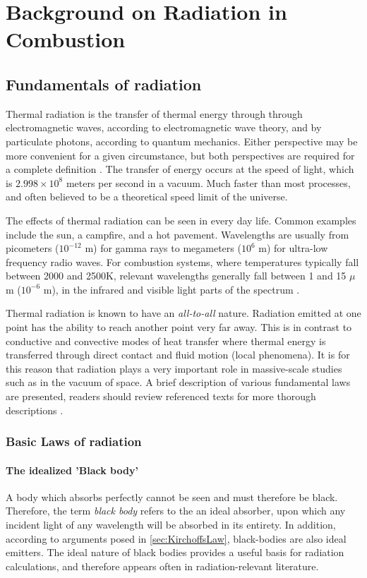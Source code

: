 \addchapheadtotoc
\chapter{Background on Radiation in Combustion}\label{chapter:Importance}

\section{Fundamentals of radiation} \label{Sec:FundOfRad}
Thermal radiation is the transfer of thermal energy through through electromagnetic waves, according to electromagnetic wave theory, and by particulate photons, according to quantum mechanics. 
Either perspective may be more convenient for a given circumstance, but both perspectives are required for a complete definition \cite{Modest2013RadiativeTransfer}. The transfer of energy occurs at the speed of light, which is $2.998 \times 10^8$ meters per second in a vacuum.
Much faster than most processes, and often believed to be a theoretical speed limit of the universe.

The effects of thermal radiation can be seen in every day life. Common examples include the sun, a campfire, and a hot pavement. 
Wavelengths are usually from picometers ($10^{-12}$ m) for gamma rays to megameters ($10^6$ m) for ultra-low frequency radio waves.
For combustion systems, where temperatures typically fall between 2000 and 2500K, relevant wavelengths generally fall between 1 and 15 $\mu{}$m ($10^{-6}$ m), in the infrared and visible light parts of the spectrum \cite{Liu2020TheFlames}.

Thermal radiation is known to have an \textit{all-to-all} nature. Radiation emitted at one point has the ability to reach another point very far away. 
This is in contrast to conductive and convective modes of heat transfer where thermal energy is transferred through direct contact and fluid motion (local phenomena). 
It is for this reason that radiation plays a very important role in massive-scale studies such as in the vacuum of space.
A brief description of various fundamental laws are presented,
readers should review referenced texts for more thorough descriptions \cite{Howell2010ThermalTransfer,Modest2013RadiativeTransfer}.

\subsection{Basic Laws of radiation}

\subsubsection{The idealized 'Black body'}
A body which absorbs perfectly cannot be seen and must therefore be black. Therefore, the term \textit{black body} refers to the an ideal absorber, upon which any incident light of any wavelength will be absorbed in its entirety. In addition, according to arguments posed in \ref{sec:KirchoffsLaw}, black-bodies are also ideal emitters.
The ideal nature of black bodies provides a useful basis for radiation calculations, and therefore appears often in radiation-relevant literature.

